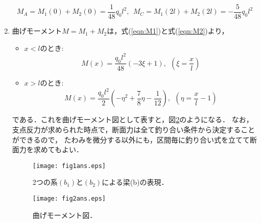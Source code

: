 \documentclass[10pt,a4j]{jarticle}
\begin{document}
\begin{enumerate}
\begin{equation}
	M_A=M_1(0)+M_2(0)= \frac{1}{48}q_0l^2, \ \ M_C=M_1(2l)+M_2(2l)=-\frac{5}{48}q_0l^2
\end{equation}
\item
曲げモーメント$M=M_1+M_2$は，式(\ref{eqn:M1})と式(\ref{eqn:M2})より，
\begin{itemize}
\item
	$x<l$のとき:
	\begin{equation}
		M(x)=\frac{q_0l^2}{48}( -3 \xi +1), \ \ \left( \xi=\frac{x}{l}\right)
		\label{eqn:M_left}
	\end{equation}
\item
	$x>l$のとき:
	\begin{equation}
		M(x)=\frac{q_0l^2}{2}\left( -\eta^2 +\frac{7}{8}\eta - \frac{1}{12}\right), \ \ 
		\left( \eta=\frac{x}{l}-1\right)
		\label{eqn:M_right}
	\end{equation}
\end{itemize}
である．これを曲げモーメント図として表すと，図\ref{fig:fig2}のようになる．
なお，支点反力が求められた時点で，断面力は全て釣り合い条件から決定することができるので，
たわみを微分する以外にも，区間毎に釣り合い式を立てて断面力を求めてもよい．
\begin{figure}[h]
	\begin{center}
	\texttt{[image: fig1ans.eps]} 
	\end{center}
	\caption{2つの系$(b_1)$と$(b_2)$による梁(b)の表現．}
	\label{fig:fig1}
\end{figure}
\begin{figure}[h]
	\begin{center}
	\texttt{[image: fig2ans.eps]} 
	\end{center}
	\caption{曲げモーメント図．}
	\label{fig:fig2}
\end{figure}
\end{enumerate}
\end{document}
